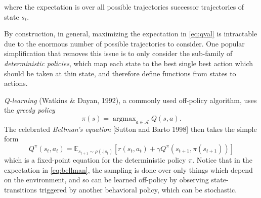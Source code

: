 \documentclass{article} %
\DeclareMathOperator{\argmax}{argmax}
\begin{document}
where the expectation is over all possible trajectories successor
trajectories of state $s_t$.

By construction, in general, maximizing the expectation in  \eqref{eq:qval} is intractable due to
the enormous number of possible trajectories to consider.
One popular simplification that removes this issue is to only consider the sub-family of \textit{deterministic policies}, which map each state to the best single best action which should be taken at thin state, and therefore define functions from states to actions.

\textit{Q-learning} (Watkins \& Dayan, 1992), a commonly used off-policy algorithm, uses the
\textit{greedy policy}
\begin{equation}
  \pi(s) = \argmax_{a \in \mathcal A}{Q}(s, a).
  \label{eq:qlearning}
\end{equation}
The celebrated \textit{Bellman's equation} [Sutton and Barto 1998] then takes the simple form
\begin{equation}
  Q^\pi(s_t, a_t) = \mathbb E_{s_{t+1} \sim \rho(.|s_t)} [r(s_t,a_t) + \gamma Q^\pi(s_{t+1}, \pi(s_{t+1}))]
  \label{eq:bellman}
\end{equation}
which is a fixed-point equation for the deterministic policy $\pi$.
Notice that in the expectation in \eqref{eq:bellman}, the sampling is done over only things which
depend on the environment, and so can be learned off-policy by observing state-transitions
triggered by another behavioral policy, which can be stochastic. 
\end{document}
